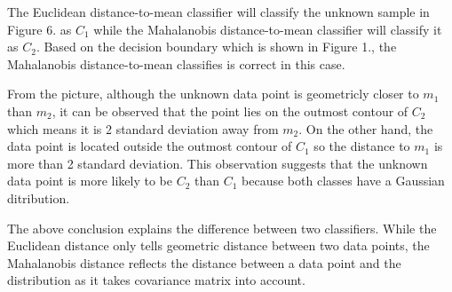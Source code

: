 \documentclass{article}
\begin{document}
The Euclidean distance-to-mean classifier will classify the unknown sample in Figure 6. as \textit{$C_1$} while the Mahalanobis distance-to-mean classifier will classify it as \textit{$C_2$}. Based on the decision boundary which is shown in Figure 1., the Mahalanobis distance-to-mean classifies is correct in this case.

\indent From the picture, although the unknown data point is geometricly closer to \textit{$m_1$} than \textit{$m_2$}, it can be observed that the point lies on the outmost contour of \textit{$C_2$} which means it is 2 standard deviation away from \textit{$m_2$}. On the other hand, the data point is located outside the outmost contour of \textit{$C_1$} so the distance to \textit{$m_1$} is more than 2 standard deviation. This observation suggests that the unknown data point is more likely to be \textit{$C_2$} than \textit{$C_1$} because both classes have a Gaussian ditribution.

\indent The above conclusion explains the difference between two classifiers. While the Euclidean distance only tells geometric distance between two data points, the Mahalanobis distance reflects the distance between a data point and the distribution as it takes covariance matrix into account.
\end{document}
